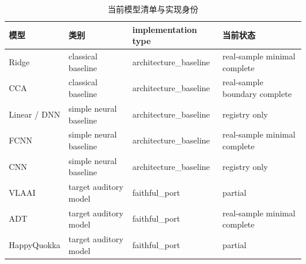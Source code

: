 \begin{table}[ht]
\centering
\caption{当前模型清单与实现身份}
\begin{tabular}{llll}
\toprule
模型 & 类别 & implementation type & 当前状态 \\
\midrule
Ridge & classical baseline & architecture\_baseline & real-sample minimal complete \\
CCA & classical baseline & architecture\_baseline & real-sample boundary complete \\
Linear / DNN & simple neural baseline & architecture\_baseline & registry only \\
FCNN & simple neural baseline & architecture\_baseline & real-sample minimal complete \\
CNN & simple neural baseline & architecture\_baseline & registry only \\
VLAAI & target auditory model & faithful\_port & partial \\
ADT & target auditory model & faithful\_port & real-sample minimal complete \\
HappyQuokka & target auditory model & faithful\_port & partial \\
\bottomrule
\end{tabular}
\end{table}
